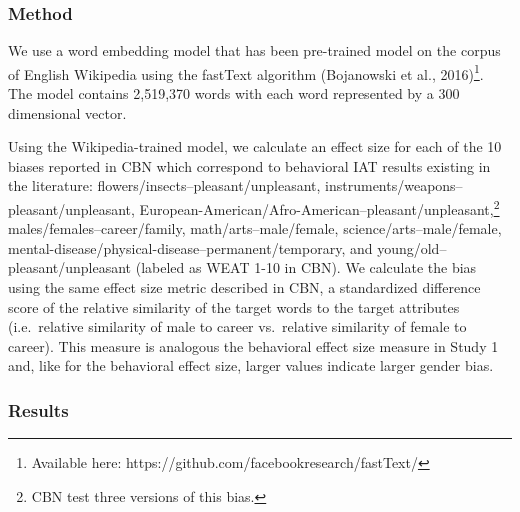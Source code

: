 \documentclass[10pt, letterpaper]{article}
\begin{document}
\subsubsection{Method}\label{method-1}

We use a word embedding model that has been pre-trained model on the
corpus of English Wikipedia using the fastText algorithm (Bojanowski et
al.,
2016)\footnote{Available here: https://github.com/facebookresearch/fastText/}.
The model contains 2,519,370 words with each word represented by a 300
dimensional vector.

Using the Wikipedia-trained model, we calculate an effect size for each
of the 10 biases reported in CBN which correspond to behavioral IAT
results existing in the literature:
flowers/insects--pleasant/unpleasant,
instruments/weapons--pleasant/unpleasant,
European-American/Afro-American--pleasant/unpleasant,\footnote{CBN test three versions of this bias.}
males/females--career/family, math/arts--male/female,
science/arts--male/female,
mental-disease/physical-disease--permanent/temporary, and
young/old--pleasant/unpleasant (labeled as WEAT 1-10 in CBN). We
calculate the bias using the same effect size metric described in CBN, a
standardized difference score of the relative similarity of the target
words to the target attributes (i.e.~relative similarity of male to
career vs.~relative similarity of female to career). This measure is
analogous the behavioral effect size measure in Study 1 and, like for
the behavioral effect size, larger values indicate larger gender bias.

\subsubsection{Results}\label{results-1}
\end{document}
